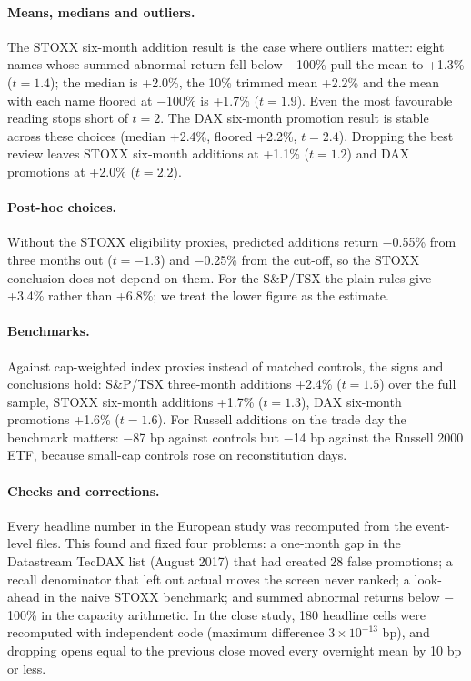 \documentclass[10pt, a4paper, twocolumn]{article}
\begin{document}
\paragraph{Means, medians and outliers.} The STOXX six-month addition result is the case where outliers matter: eight names whose summed abnormal return fell below $-$100\% pull the mean to +1.3\% ($t = 1.4$); the median is +2.0\%, the 10\% trimmed mean +2.2\% and the mean with each name floored at $-$100\% is +1.7\% ($t = 1.9$). Even the most favourable reading stops short of $t = 2$. The DAX six-month promotion result is stable across these choices (median +2.4\%, floored +2.2\%, $t = 2.4$). Dropping the best review leaves STOXX six-month additions at +1.1\% ($t = 1.2$) and DAX promotions at +2.0\% ($t = 2.2$).

\paragraph{Post-hoc choices.} Without the STOXX eligibility proxies, predicted additions return $-$0.55\% from three months out ($t = -1.3$) and $-$0.25\% from the cut-off, so the STOXX conclusion does not depend on them. For the S\&P/TSX the plain rules give +3.4\% rather than +6.8\%; we treat the lower figure as the estimate.

\paragraph{Benchmarks.} Against cap-weighted index proxies instead of matched controls, the signs and conclusions hold: S\&P/TSX three-month additions +2.4\% ($t = 1.5$) over the full sample, STOXX six-month additions +1.7\% ($t = 1.3$), DAX six-month promotions +1.6\% ($t = 1.6$). For Russell additions on the trade day the benchmark matters: $-$87 bp against controls but $-$14 bp against the Russell 2000 ETF, because small-cap controls rose on reconstitution days.

\paragraph{Checks and corrections.} Every headline number in the European study was recomputed from the event-level files. This found and fixed four problems: a one-month gap in the Datastream TecDAX list (August 2017) that had created 28 false promotions; a recall denominator that left out actual moves the screen never ranked; a look-ahead in the naive STOXX benchmark; and summed abnormal returns below $-$100\% in the capacity arithmetic. In the close study, 180 headline cells were recomputed with independent code (maximum difference $3\times10^{-13}$ bp), and dropping opens equal to the previous close moved every overnight mean by 10 bp or less.
\end{document}
